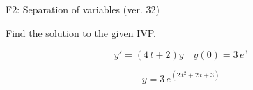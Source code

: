 \begin{exercise}
  \begin{exerciseTitle}F2: Separation of variables (ver. 32)\end{exerciseTitle}
  \begin{exerciseStatement}
    
Find the solution to the given IVP.

    
\[y'=( 4 \, t + 2 )y\hspace{1em} y(0)= 3 \, e^{3}\]

  \end{exerciseStatement}
  \begin{exerciseAnswer}
    
\[y= 3 \, e^{\left(2 \, t^{2} + 2 \, t + 3\right)}\]

  \end{exerciseAnswer}
\end{exercise}